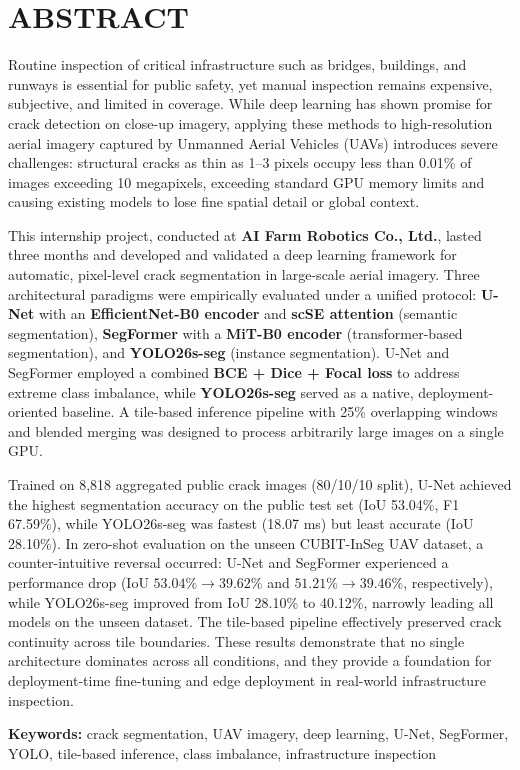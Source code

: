 \clearpage
{}
\chapter*{ABSTRACT}

\hs Routine inspection of critical infrastructure such as bridges, buildings, and runways is essential for public safety, yet manual inspection remains expensive, subjective, and limited in coverage. While deep learning has shown promise for crack detection on close-up imagery, applying these methods to high-resolution aerial imagery captured by Unmanned Aerial Vehicles (UAVs) introduces severe challenges: structural cracks as thin as 1–3 pixels occupy less than 0.01\% of images exceeding 10 megapixels, exceeding standard GPU memory limits and causing existing models to lose fine spatial detail or global context.

This internship project, conducted at \textbf{AI Farm Robotics Co., Ltd.}, lasted three months and developed and validated a deep learning framework for automatic, pixel-level crack segmentation in large-scale aerial imagery. Three architectural paradigms were empirically evaluated under a unified protocol: \textbf{U-Net} with an \textbf{EfficientNet-B0 encoder} and \textbf{scSE attention} (semantic segmentation), \textbf{SegFormer} with a \textbf{MiT-B0 encoder} (transformer-based segmentation), and \textbf{YOLO26s-seg} (instance segmentation). U-Net and SegFormer employed a combined \textbf{BCE + Dice + Focal loss} to address extreme class imbalance, while \textbf{YOLO26s-seg} served as a native, deployment-oriented baseline. A tile-based inference pipeline with 25\% overlapping windows and blended merging was designed to process arbitrarily large images on a single GPU.

Trained on 8,818 aggregated public crack images (80/10/10 split), U-Net achieved the highest segmentation accuracy on the public test set (IoU 53.04\%, F1 67.59\%), while YOLO26s-seg was fastest (18.07 ms) but least accurate (IoU 28.10\%). In zero-shot evaluation on the unseen CUBIT-InSeg UAV dataset, a counter-intuitive reversal occurred: U-Net and SegFormer experienced a performance drop (IoU $53.04\% \to 39.62\%$ and $51.21\% \to 39.46\%$, respectively), while YOLO26s-seg improved from IoU 28.10\% to 40.12\%, narrowly leading all models on the unseen dataset. The tile-based pipeline effectively preserved crack continuity across tile boundaries. These results demonstrate that no single architecture dominates across all conditions, and they provide a foundation for deployment-time fine-tuning and edge deployment in real-world infrastructure inspection.

\vspace{0.5cm}
\noindent\textbf{Keywords:} crack segmentation, UAV imagery, deep learning, U-Net, SegFormer, YOLO, tile-based inference, class imbalance, infrastructure inspection
